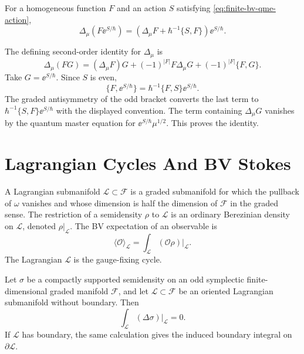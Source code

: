 \begin{remark}
\label{rem:bv-product-identity}
For a homogeneous function \(F\) and an action \(S\) satisfying
\eqref{eq:finite-bv-qme-action},
\[
  \Delta_\mu(F\ee^{S/\hbar})
  =
  \left(\Delta_\mu F+\hbar^{-1}\{S,F\}\right)\ee^{S/\hbar}.
\]

The defining second-order identity for \(\Delta_\mu\) is
\[
  \Delta_\mu(FG)
  =
  (\Delta_\mu F)G
  +(-1)^{|F|}F\Delta_\mu G
  +(-1)^{|F|}\{F,G\}.
\]
Take \(G=\ee^{S/\hbar}\).  Since \(S\) is even,
\[
  \{F,\ee^{S/\hbar}\}
  =
  \hbar^{-1}\{F,S\}\ee^{S/\hbar}.
\]
The graded antisymmetry of the odd bracket converts the last term to
\(\hbar^{-1}\{S,F\}\ee^{S/\hbar}\) with the displayed convention.  The term
containing \(\Delta_\mu G\) vanishes by the quantum master equation for
\(\ee^{S/\hbar}\mu^{1/2}\).  This proves the identity.
\end{remark}

\section{Lagrangian Cycles And BV Stokes}

A Lagrangian submanifold \(\mathcal L\subset\mathcal F\) is a graded
submanifold for which the pullback of \(\omega\) vanishes and whose dimension
is half the dimension of \(\mathcal F\) in the graded sense.  The restriction
of a semidensity \(\rho\) to \(\mathcal L\) is an ordinary Berezinian density
on \(\mathcal L\), denoted \(\rho|_{\mathcal L}\).  The BV expectation of an
observable is
\[
  \langle\mathcal O\rangle_{\mathcal L}
  =
  \int_{\mathcal L}(\mathcal O\rho)|_{\mathcal L}.
\]
The Lagrangian \(\mathcal L\) is the gauge-fixing cycle.

\begin{theorem}
\label{thm:finite-bv-stokes}
Let \(\sigma\) be a compactly supported semidensity on an odd symplectic
finite-dimensional graded manifold \(\mathcal F\), and let
\(\mathcal L\subset\mathcal F\) be an oriented Lagrangian submanifold without
boundary.  Then
\[
  \int_{\mathcal L}(\Delta\sigma)|_{\mathcal L}=0 .
\]
If \(\mathcal L\) has boundary, the same calculation gives the induced
boundary integral on \(\partial\mathcal L\).
\end{theorem}

